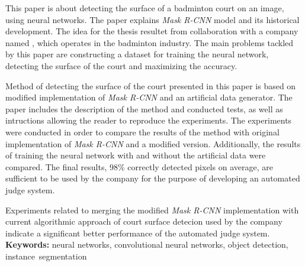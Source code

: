 
This paper is about detecting the surface of a badminton court on an image, using neural networks.
The paper explains \textit{Mask R-CNN} model and its historical development.
The idea for the thesis resultet from collaboration with a company named \blue{}, which operates in the badminton industry.
The main problems tackled by this paper are constructing a dataset for training the neural network, detecting the surface of the court and maximizing the accuracy.

Method of detecting the surface of the court presented in this paper is based on modified implementation of \textit{Mask R-CNN} and an artificial data generator. The paper includes the description of the method and conducted tests, as well as intructions allowing the reader to reproduce the experiments. The experiments were conducted in order to compare the results of the method with original implementation of \textit{Mask R-CNN} and a modified version. Additionally, the results of training the neural network with and without the artificial data were compared. The final results, 98\% correctly detected pixels on average, are sufficient to be used by the \blue{} company for the purpose of developing an automated judge system.

Experiments related to merging the modified \textit{Mask R-CNN} implementation with current algorithmic approach of court surface detecion used by the \blue{} company indicate a significant better performance of the automated judge system.
\\

\noindent \textbf{Keywords:} neural networks, convolutional neural networks, object detection, instance~segmentation
